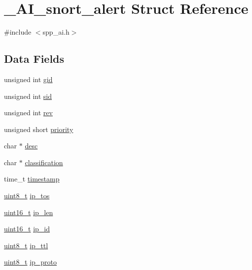 \hypertarget{struct__AI__snort__alert}{
\section{\_\-AI\_\-snort\_\-alert Struct Reference}
\label{struct__AI__snort__alert}
}


{\ttfamily \#include $<$spp\_\-ai.h$>$}

\subsection*{Data Fields}
\begin{DoxyCompactItemize}
\item 
unsigned int \hyperlink{struct__AI__snort__alert_af8408be5da59cda853442dd13465c0f6}{gid}
\item 
unsigned int \hyperlink{struct__AI__snort__alert_a3349aa68d2234f8ffd897367c3a8a137}{sid}
\item 
unsigned int \hyperlink{struct__AI__snort__alert_a864d3baa48586d6a31639f4cd27d9d37}{rev}
\item 
unsigned short \hyperlink{struct__AI__snort__alert_a25661fa4e212c5e30af5e6a892985ec9}{priority}
\item 
char $\ast$ \hyperlink{struct__AI__snort__alert_ac0902d7c756ec675fb06347ce4706135}{desc}
\item 
char $\ast$ \hyperlink{struct__AI__snort__alert_aa89585e14acb2c4e684a1552d322632f}{classification}
\item 
time\_\-t \hyperlink{struct__AI__snort__alert_a10a67f60ca3da339a2104849a0b2ac19}{timestamp}
\item 
\hyperlink{spp__ai_8h_aba7bc1797add20fe3efdf37ced1182c5}{uint8\_\-t} \hyperlink{struct__AI__snort__alert_a3f3c47f9baf3229d067504a85873b416}{ip\_\-tos}
\item 
\hyperlink{spp__ai_8h_a273cf69d639a59973b6019625df33e30}{uint16\_\-t} \hyperlink{struct__AI__snort__alert_ad3ffe99036513d5f33b94d22fb84f8f1}{ip\_\-len}
\item 
\hyperlink{spp__ai_8h_a273cf69d639a59973b6019625df33e30}{uint16\_\-t} \hyperlink{struct__AI__snort__alert_a2fc673dec85a7b49dd16ac7c0bb1bb78}{ip\_\-id}
\item 
\hyperlink{spp__ai_8h_aba7bc1797add20fe3efdf37ced1182c5}{uint8\_\-t} \hyperlink{struct__AI__snort__alert_a3c9bbe84ec696cd58668a45799a66600}{ip\_\-ttl}
\item 
\hyperlink{spp__ai_8h_aba7bc1797add20fe3efdf37ced1182c5}{uint8\_\-t} \hyperlink{struct__AI__snort__alert_a5ea7b250ac1c472f3ab57565b6df2536}{ip\_\-proto}

\end{DoxyCompactItemize}
